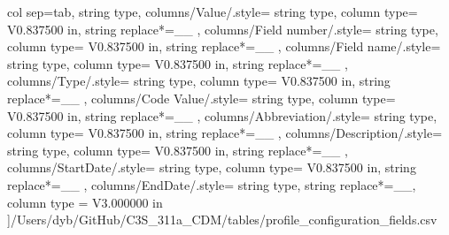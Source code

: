 \begin{landscape}
    col sep=tab,
    string type,
    columns/Value/.style={
            string type, 
            column type= V{0.837500 in}, 
            string replace*={_}{\_}
        },
    columns/Field number/.style={
            string type, 
            column type= V{0.837500 in}, 
            string replace*={_}{\_}
        },
    columns/Field name/.style={
            string type, 
            column type= V{0.837500 in}, 
            string replace*={_}{\_}
        },
    columns/Type/.style={
            string type, 
            column type= V{0.837500 in}, 
            string replace*={_}{\_}
        },
    columns/Code Value/.style={
            string type, 
            column type= V{0.837500 in}, 
            string replace*={_}{\_}
        },
    columns/Abbreviation/.style={
            string type, 
            column type= V{0.837500 in}, 
            string replace*={_}{\_}
        },
    columns/Description/.style={
            string type, 
            column type= V{0.837500 in}, 
            string replace*={_}{\_}
        },
    columns/StartDate/.style={
            string type, 
            column type= V{0.837500 in}, 
            string replace*={_}{\_}
        },
    columns/EndDate/.style={
            string type, 
            string replace*={_}{\_},
            column type = V{3.000000 in}
        }
    ]{/Users/dyb/GitHub/C3S_311a_CDM/tables/profile_configuration_fields.csv}
\end{landscape}

